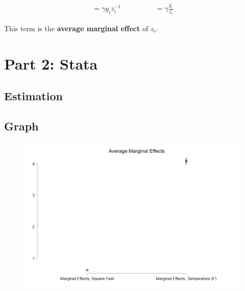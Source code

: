 \documentclass{article}
\begin{document}
\begin{align}
    = \gamma y_i z_i ^{-1} \hspace{2cm}= \gamma \frac{y_i}{z_i}
\end{align}

This term is the \textbf{average marginal effect} of $z_i$.


\vspace{10cm}
\section{Part 2: Stata}

\subsection{Estimation}




\vspace{1cm}
\subsection{Graph}

\begin{figure}[ht]
    \centering
    \includegraphics[scale = 0.4]{homework3/output/ame_hw3.png}
\end{figure}
\end{document}
